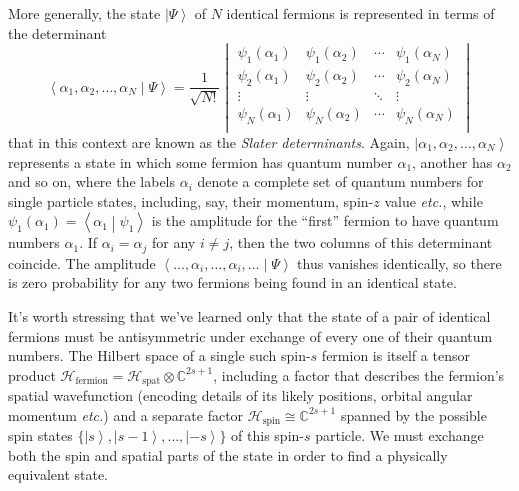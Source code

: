 \documentclass{article}
\theoremstyle{plain}\theoremheaderfont{\normalfont\itshape}\theorembodyfont{\rmfamily}\theoremseparator{.}\newtheorem*{rem}{Remark}\newtheorem*{ex}{Example}\newtheorem*{proof}{Proof}\newtheorem*{altp}{Alternative proof}
\theoremstyle{plain}\theoremheaderfont{\normalfont\bfseries}\theorembodyfont{\rmfamily}\theoremseparator{.}\newtheorem{thm}{Theorem}[section]\newtheorem{lem}[thm]{Lemma}\newtheorem{prop}[thm]{Proposition}\newtheorem*{cor}{Corollary}\newtheorem{defn}[thm]{Definition}\newtheorem{clm}[thm]{Claim}\newtheorem{clminproof}{Claim}
\theoremstyle{break}\theoremheaderfont{\normalfont\itshape}\theorembodyfont{\rmfamily}\theoremseparator{.\medskip}\newtheorem*{proofskip}{Proof}\newtheorem*{exs}{Examples}\newtheorem*{rems}{Remarks}
\theoremstyle{break}\theoremheaderfont{\normalfont\bfseries}\theorembodyfont{\rmfamily}\theoremseparator{.\medskip}\newtheorem{lemskip}[thm]{Lemma}\newtheorem{defnskip}[thm]{Definition}\newtheorem{propskip}[thm]{Proposition}\newtheorem{thmskip}[thm]{Theorem}
\numberwithin{equation}{section}
\newcommand{\ket}[1]{\left| #1 \right\rangle}
\newcommand{\braket}[2]{\left\langle #1 \middle| #2 \right\rangle}
\newcommand{\hb}{\mathcal{H}}
\newcommand{\CC}{\mathbb{C}}
\begin{document}
    More generally, the state \(\ket{\Psi}\) of \(N\) identical fermions is represented in terms of the determinant
    \begin{equation}
        \braket{\alpha_1,\alpha_2,\dots,\alpha_N}{\Psi}=\frac{1}{\sqrt{N!}}\begin{vmatrix}
            \psi_1(\alpha_1) & \psi_1(\alpha_2) & \cdots & \psi_1(\alpha_N) \\
            \psi_2(\alpha_1) & \psi_2(\alpha_2) & \cdots & \psi_2(\alpha_N) \\
            \vdots & \vdots & \ddots & \vdots \\
            \psi_N(\alpha_1) & \psi_N(\alpha_2) & \cdots & \psi_N(\alpha_N) \\
        \end{vmatrix}
    \end{equation}
    that in this context are known as the \textit{Slater determinants}. Again, \(\ket{\alpha_1,\alpha_2,\dots,\alpha_N}\) represents a state in which some fermion has quantum number \(\alpha_1\), another has \(\alpha_2\) and so on, where the labels \(\alpha_i\) denote a complete set of quantum numbers for single particle states, including, say, their momentum, spin-\(z\) value \textit{etc.}, while \(\psi_1(\alpha_1)=\braket{\alpha_1}{\psi_1}\) is the amplitude for the ``first'' fermion to have quantum numbers \(\alpha_1\). If \(\alpha_i=\alpha_j\) for any \(i\ne j\), then the two columns of this determinant coincide. The amplitude \(\braket{\dots,\alpha_i,\dots,\alpha_i,\dots}{\Psi}\) thus vanishes identically, so there is zero probability for any two fermions being found in an identical state.

    It's worth stressing that we've learned only that the state of a pair of identical fermions must be antisymmetric under exchange of every one of their quantum numbers. The Hilbert space of a single such spin-\(s\) fermion is itself a tensor product \(\hb_{\text{fermion}}=\hb_{\text{spat}}\otimes \CC^{2s+1}\), including a factor that describes the fermion's spatial wavefunction (encoding details of its likely positions, orbital angular momentum \textit{etc.}) and a separate factor \(\hb_{\text{spin}}\cong\CC^{2s+1}\) spanned by the possible spin states \(\{\ket{s},\ket{s-1},\dots,\ket{-s}\}\) of this spin-\(s\) particle. We must exchange both the spin and spatial parts of the state in order to find a physically equivalent state.
\end{document}

